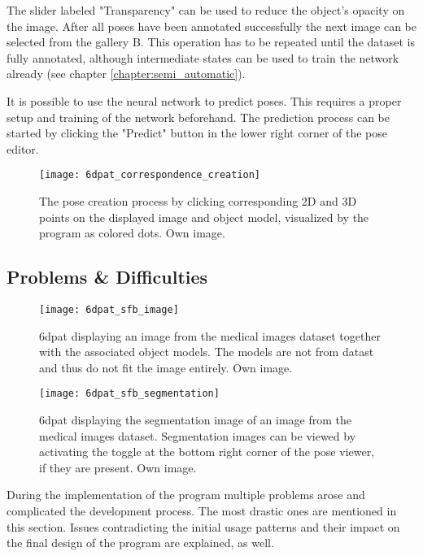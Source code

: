 The slider labeled "Transparency" can be used to reduce the object's opacity on the image. After all poses have been annotated successfully the next image can be selected from the gallery B. This operation has to be repeated until the dataset is fully annotated, although intermediate states can be used to train the network already (see chapter \ref{chapter:semi_automatic}).

It is possible to use the neural network to predict poses. This requires a proper setup and training of the network beforehand. The prediction process can be started by clicking the "Predict" button in the lower right corner of the pose editor.

\begin{figure}[!tbp]
	\centering
    \texttt{[image: 6dpat\_correspondence\_creation]}
    \caption{The pose creation process by clicking corresponding 2D and 3D points on the displayed image and object model, visualized by the program as colored dots. Own image.}
    \label{fig:6dpat_correspondence_creation}
\end{figure} 

\subsection{Problems \& Difficulties} \label{section:6dpat_difficulties}

\begin{figure}[!tbp]
	\centering
    \texttt{[image: 6dpat\_sfb\_image]}
    \caption{\gls{6dpat} displaying an image from the medical images dataset together with the associated object models. The models are not from datast and thus do not fit the image entirely. Own image.}
    \label{fig:6dpat_sfb_image}
\end{figure} 

\begin{figure}[!tbp]
	\centering
    \texttt{[image: 6dpat\_sfb\_segmentation]}
    \caption{\gls{6dpat} displaying the segmentation image of an image from the medical images dataset. Segmentation images can be viewed by activating the toggle at the bottom right corner of the pose viewer, if they are present. Own image.}
    \label{fig:6dpat_sfb_segmentation}
\end{figure} 

During the implementation of the program multiple problems arose and complicated the development process. The most drastic ones are mentioned in this section. Issues contradicting the initial usage patterns and their impact on the final design of the program are explained, as well. \\

